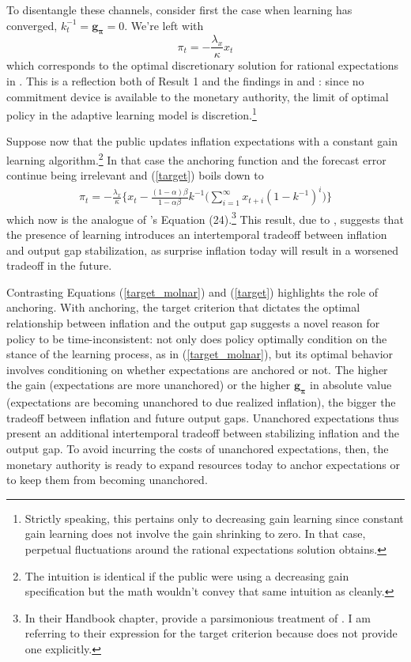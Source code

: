 \documentclass[11pt]{article}
\renewcommand{\[}{\begin{equation}}
\renewcommand{\]}{\end{equation}}
\begin{document}
To disentangle these channels, consider first the case when learning has converged, $k_t^{-1} = \mathbf{g_\pi} = 0$. We're left with 
\begin{equation}
\pi_t  = -\frac{\lambda_x}{\kappa}x_t \label{cgg_discretion}
\end{equation}
which corresponds to the optimal discretionary solution for rational expectations in \cite{clarida1999science}. This is a reflection both of Result 1 and the findings in \cite{molnar2014optimal} and \cite{mele2019perils}: since no commitment device is available to the monetary authority, the limit of optimal policy in the adaptive learning model is discretion.\footnote{Strictly speaking, this pertains only to decreasing gain learning since constant gain learning does not involve the gain shrinking to zero. In that case, perpetual fluctuations around the rational expectations solution obtains.}

Suppose now that the public updates inflation expectations with a constant gain learning algorithm.\footnote{The intuition is identical if the public were using a decreasing gain specification but the math wouldn't convey that same intuition as cleanly.} In that case the anchoring function and the forecast error continue being irrelevant and (\ref{target}) boils down to
\begin{align}
\pi_t  = -\frac{\lambda_x}{\kappa}\bigg\{x_t - \frac{(1-\alpha)\beta}{1-\alpha\beta} k^{-1}
\bigg(\sum_{i=1}^{\infty}x_{t+i}(1-k^{-1})^i \bigg)
\bigg\} \label{target_molnar}
\end{align}
which now is the analogue of \cite{gaspar2010inflation}'s Equation (24).\footnote{In their Handbook chapter, \cite{gaspar2010inflation} provide a parsimonious treatment of \cite{molnar2014optimal}. I am referring to their expression for the target criterion because \cite{molnar2014optimal} does not provide one explicitly.} This result, due to \cite{molnar2014optimal}, suggests that the presence of learning introduces an intertemporal tradeoff between inflation and output gap stabilization, as surprise inflation today will result in a worsened tradeoff in the future.

Contrasting Equations (\ref{target_molnar}) and (\ref{target}) highlights the role of anchoring. With anchoring, the target criterion that dictates the optimal relationship between inflation and the output gap suggests a novel reason for policy to be time-inconsistent: not only does policy optimally condition on the stance of the learning process, as in (\ref{target_molnar}), but its optimal behavior involves conditioning on whether expectations are anchored or not. The higher the gain (expectations are more unanchored) or the higher $\mathbf{g_{\pi}}$ in absolute value (expectations are becoming unanchored to due realized inflation), the bigger the tradeoff between inflation and future output gaps. Unanchored expectations thus present an additional intertemporal tradeoff between stabilizing inflation and the output gap. To avoid incurring the costs of unanchored expectations, then, the monetary authority is ready to expand resources today to anchor expectations or to keep them from becoming unanchored.
\end{document}
